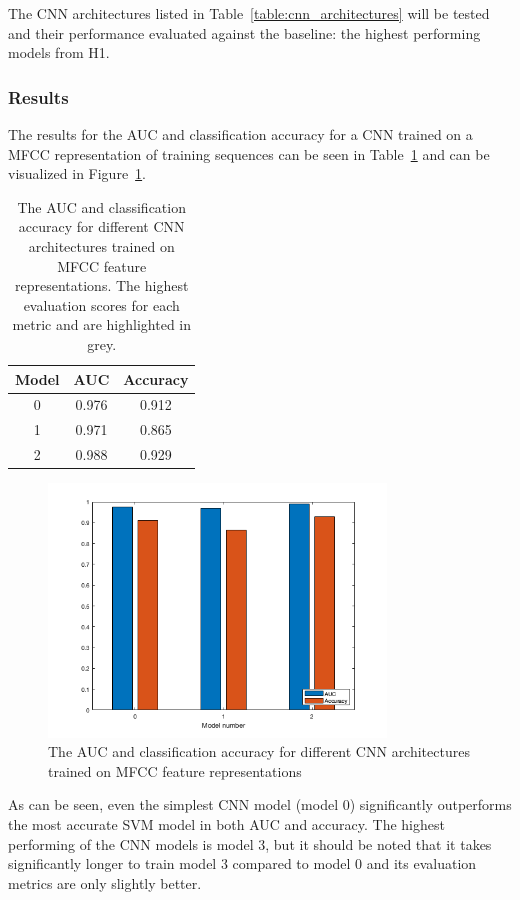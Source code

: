The CNN architectures listed in Table~\ref{table:cnn_architectures} will
be tested and their performance evaluated against the baseline: the highest
performing models from H1.

\subsubsection{Results}

The results for the AUC and classification accuracy for a CNN trained on a MFCC
representation of training sequences can be seen in
Table~\ref{table:cnn_mfcc_results} and can be visualized in
Figure~\ref{fig:cnn_mfcc_results}.

\begin{table}[h!t]
\begin{center}
\begin{tabular}{c c c}
\toprule
Model & AUC & Accuracy \\ [0.5ex]
\midrule
0 & 0.976 & 0.912 \\
1 & 0.971 & 0.865 \\
2 & \cellcolor{lightgray} 0.988 & \cellcolor{lightgray} 0.929 \\
\bottomrule
\end{tabular}
\caption{The AUC and classification accuracy for different CNN architectures
trained on MFCC feature representations. The highest evaluation scores for each
metric and are highlighted in grey.}\label{table:cnn_mfcc_results}
\end{center}
\end{table}

\begin{figure}[ht]
  \centering
  \includegraphics[width=0.8\textwidth]{figures/hyp2_cnn_mfcc_results.png}
  \caption{The AUC and classification accuracy for different CNN architectures
  trained on MFCC feature representations}\label{fig:cnn_mfcc_results}
\end{figure}

As can be seen, even the simplest CNN model (model 0) significantly outperforms
the most accurate SVM model in both AUC and accuracy. The highest performing of
the CNN models is model 3, but it should be noted that it takes significantly
longer to train model 3 compared to model 0 and its evaluation metrics are only
slightly better.
